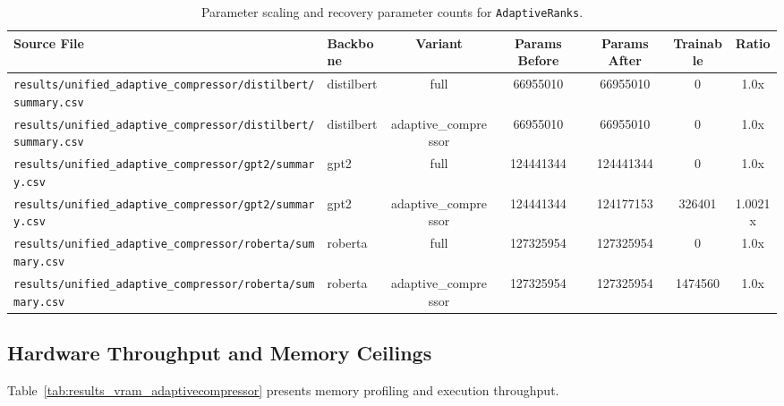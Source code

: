 \begin{table}[t]
\centering
\small
\begin{tabular}{llccccc}
\toprule
\textbf{Source File} & \textbf{Backbone} & \textbf{Variant} & \textbf{Params Before} & \textbf{Params After} & \textbf{Trainable} & \textbf{Ratio} \\
\midrule
\texttt{results/unified\_adaptive\_compressor/distilbert/summary.csv} & distilbert & full & 66955010 & 66955010 & 0 & 1.0x \\
\texttt{results/unified\_adaptive\_compressor/distilbert/summary.csv} & distilbert & adaptive\_compressor & 66955010 & 66955010 & 0 & 1.0x \\
\texttt{results/unified\_adaptive\_compressor/gpt2/summary.csv} & gpt2 & full & 124441344 & 124441344 & 0 & 1.0x \\
\texttt{results/unified\_adaptive\_compressor/gpt2/summary.csv} & gpt2 & adaptive\_compressor & 124441344 & 124177153 & 326401 & 1.0021x \\
\texttt{results/unified\_adaptive\_compressor/roberta/summary.csv} & roberta & full & 127325954 & 127325954 & 0 & 1.0x \\
\texttt{results/unified\_adaptive\_compressor/roberta/summary.csv} & roberta & adaptive\_compressor & 127325954 & 127325954 & 1474560 & 1.0x \\
\bottomrule
\end{tabular}
\caption{Parameter scaling and recovery parameter counts for \texttt{AdaptiveRanks}.}
\label{tab:results_params_adaptivecompressor}
\end{table}

\subsection{Hardware Throughput and Memory Ceilings}
Table~\ref{tab:results_vram_adaptivecompressor} presents memory profiling and execution throughput.

